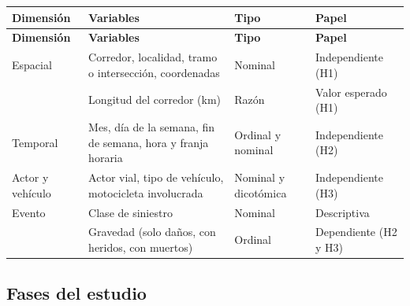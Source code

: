 \documentclass[12pt,letterpaper]{article}
\begin{document}
\begingroup
\begin{longtable}{@{}L{0.18}L{0.38}L{0.19}L{0.25}@{}}
\toprule
\textbf{Dimensión} & \textbf{Variables} & \textbf{Tipo} & \textbf{Papel} \\
\midrule
\endfirsthead
\toprule
\textbf{Dimensión} & \textbf{Variables} & \textbf{Tipo} & \textbf{Papel} \\
\midrule
\endhead
Espacial & Corredor, localidad, tramo o intersección, coordenadas & Nominal & Independiente (H1) \\
 & Longitud del corredor (km) & Razón & Valor esperado (H1) \\
Temporal & Mes, día de la semana, fin de semana, hora y franja horaria & Ordinal y nominal & Independiente (H2) \\
Actor y vehículo & Actor vial, tipo de vehículo, motocicleta involucrada & Nominal y dicotómica & Independiente (H3) \\
Evento & Clase de siniestro & Nominal & Descriptiva \\
 & Gravedad (solo daños, con heridos, con muertos) & Ordinal & Dependiente (H2 y H3) \\
\bottomrule
\end{longtable}
\endgroup

\hypertarget{fases-del-estudio}{%
\subsection{Fases del estudio}\label{fases-del-estudio}}
\end{document}

